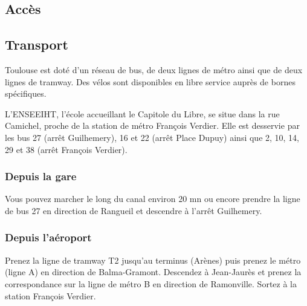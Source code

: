
\subsection{Accès}


\subsection{Transport}

Toulouse est doté d'un réseau de bus, de deux lignes de métro ainsi que de
deux lignes de tramway. Des vélos sont disponibles en libre service auprès
de bornes spécifiques.

L'ENSEEIHT, l'école accueillant le Capitole du Libre, se situe dans la rue
Camichel, proche de la station de métro François Verdier. Elle est desservie
par les bus 27 (arrêt Guilhemery), 16 et 22 (arrêt Place Dupuy) ainsi que 2,
10, 14, 29 et 38 (arrêt François Verdier).

\subsubsection*{Depuis la gare}

Vous pouvez marcher le long du canal environ 20 mn ou encore prendre la
ligne de bus 27 en direction de Rangueil et descendre à l'arrêt Guilhemery.

\subsubsection*{Depuis l'aéroport}

Prenez la ligne de tramway T2 jusqu'au terminus (Arènes) puis prenez le métro
(ligne A) en direction de Balma-Gramont. Descendez à Jean-Jaurès et prenez
la correspondance sur la ligne de métro B en direction de Ramonville. Sortez
à la station François Verdier.

